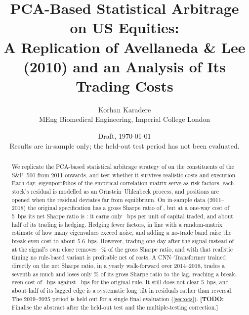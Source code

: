 \documentclass[11pt,a4paper]{article}
\title{PCA-Based Statistical Arbitrage on US Equities:\\
\large A Replication of Avellaneda \& Lee (2010) and an Analysis of Its Trading Costs}
\author{Korhan Karadere\\
\small MEng Biomedical Engineering, Imperial College London}
\date{Draft, \today\\ \small\textcolor{red!70!black}{Results are in-sample only; the held-out test period has not been evaluated.}}
\newcommand{\todo}[1]{\textcolor{red!70!black}{\textbf{[TODO:} #1\textbf{]}}}
\begin{document}
\maketitle

\begin{abstract}
We replicate the PCA-based statistical arbitrage strategy of \citet{avellaneda2010} on the
constituents of the S\&P~500 from 2011 onwards, and test whether it survives realistic costs and
execution. Each day, eigenportfolios of the empirical correlation matrix serve as risk factors, each
stock's residual is modelled as an Ornstein--Uhlenbeck process, and positions are opened when the
residual deviates far from equilibrium. On in-sample data (2011--2018) the original specification
has a gross Sharpe ratio of \BaseGrossSR{}, but at a one-way cost of 5~bps its net Sharpe ratio is
\BaseNetSR{}: it earns only \BaseBreakeven{}~bps per unit of capital traded, and about half of its
trading is hedging. Hedging fewer factors, in line with a random-matrix estimate of how many
eigenvalues exceed noise, and adding a no-trade band raise the break-even cost to about 5.6~bps.
However, trading one day after the signal instead of at the signal's own close removes
\LagLossBest--\LagLossBase\% of the gross Sharpe ratio, and with that realistic timing no rule-based
variant is profitable net of costs. A CNN--Transformer trained directly on the net Sharpe ratio, in
a yearly walk-forward over 2014--2018, trades a seventh as much and loses only \DeepLagLoss\% of its
gross Sharpe ratio to the lag, reaching a break-even cost of \DeepLagBE~bps against
\ALDeepYearsLagBE~bps for the original rule. It still does not clear 5~bps, and about half of its
lagged edge is a systematic long tilt in residuals rather than reversal. The 2019--2025 period is
held out for a single final evaluation (\cref{sec:oos}).
\todo{Finalise the abstract after the held-out test and the multiple-testing correction.}
\end{abstract}

\tableofcontents
\newpage














\appendix


\end{document}
